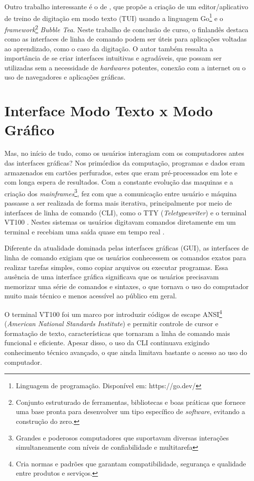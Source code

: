Outro trabalho interessante é o de \cite{Lindroos2025}, que propõe a criação de
um editor/aplicativo de treino de digitação em modo texto (TUI) usando a
linguagem Go\footnote{Linguagem de programação. Disponível em: https://go.dev/} e
o \textit{framework}\footnote{Conjunto estruturado de ferramentas, bibliotecas e
boas práticas que fornece uma base pronta para desenvolver um tipo específico de
\textit{software}, evitando a construção do zero.} \textit{Bubble Tea}. Neste trabalho
de conclusão de curso, o finlandês destaca como as interfaces de linha de
comando podem ser úteis para aplicações voltadas ao aprendizado, como o caso da digitação.
O autor também ressalta a importância de se criar interfaces intuitivas e
agradáveis, que possam ser utilizadas sem a necessidade de \textit{hardwares}
potentes, conexão com a internet ou o uso de navegadores e aplicações gráficas.

\section{Interface Modo Texto x Modo Gráfico}

Mas, no início de tudo, como os usuários interagiam com os computadores antes
das interfaces gráficas? Nos primórdios da computação, programas e dados eram
armazenados em cartões perfurados, estes que eram pré-processados em lote e com longa
espera de resultados. Com a constante evolução das maquinas e a criação dos
\textit{mainframes}\footnote{Grandes e poderosos computadores que suportavam
diversas interações simultaneamente com níveis de confiabilidade e multitarefa},
fez com que a comunicação entre usuário e máquina passasse a ser realizada de forma
mais iterativa, principalmente por meio de interfaces de linha de comando (CLI),
como o TTY (\textit{Teletypewriter}) \cite{ColumbiaTeletype2023} e o terminal
VT100 \cite{DEC_VT100}. Nestes sistemas os usuários digitavam comandos diretamente
em um terminal e recebiam uma saída quase em tempo real \cite{ComputerHistoryMuseum}.

Diferente da atualidade dominada pelas interfaces gráficas (GUI), as interfaces
de linha de comando exigiam que os usuários conhecessem os comandos exatos para
realizar tarefas simples, como copiar arquivos ou executar programas. Essa
ausência de uma interface gráfica significava que os usuários precisavam
memorizar uma série de comandos e sintaxes, o que tornava o uso do computador muito
mais técnico e menos acessível ao público em geral.

O terminal VT100 foi um marco por introduzir códigos de escape ANSI\footnote{Cria
normas e padrões que garantam compatibilidade, segurança e qualidade entre produtos
e serviços.} (\textit{American National Standards Institute}) e permitir controle
de cursor e formatação de texto, características que tornaram a linha de comando
mais funcional e eficiente. Apesar disso, o uso da CLI continuava exigindo
conhecimento técnico avançado, o que ainda limitava bastante o acesso ao uso do computador.


